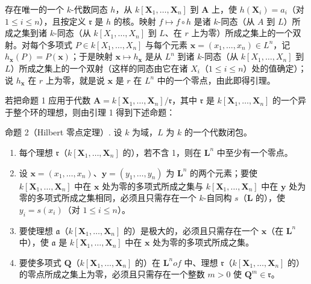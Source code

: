 存在唯一的一个 \(k\)-代数同态 \(h\)，从 \(k[\mathbf{X}_1, \ldots, \mathbf{X}_n]\) 到 \(\mathbf{A}\) 上，使 \(h(\mathbf{X}_i) = a_i\)（对 \(1 \leqslant i \leqslant n\)），且按定义 \(\mathfrak{r}\) 是 \(h\) 的核。映射 \(f \mapsto f \circ h\) 是诸 \(k\)-同态（从 \(A\) 到 \(L\)）所成之集到诸 \(k\)-同态（从 \(k[X_1, \ldots, X_n]\) 到 \(L\)、在 \(r\) 上为零）所成之集上的一个双射。对每个多项式 \(P \in k[X_1, \ldots, X_n]\) 与每个元素 \(\mathbf{x} = (x_1, \ldots, x_n) \in L^n\)，记 \(h_{\mathbf{x}}(P) = P(\mathbf{x})\)；于是映射 \(\mathbf{x} \mapsto h_{\mathbf{x}}\) 是从 \(L^n\) 到诸 \(k\)-同态（从 \(k[X_1, \ldots, X_n]\) 到 \(L\)）所成之集上的一个双射（这样的同态由它在诸 \(X_i\)（\(1 \leqslant i \leqslant n\)）处的值确定）；说 \(h_{\mathbf{x}}\) 在 \(r\) 上为零，就是说 \(\mathbf{x}\) 是 \(r\) 在 \(L^n\) 中的一个零点，由此即得引理。

若把命题 1 应用于代数 \(\mathbf{A} = k[\mathbf{X}_1, \ldots, \mathbf{X}_n] / \mathfrak{r}\)，其中 \(\mathfrak{r}\) 是 \(k[\mathbf{X}_1, \ldots, \mathbf{X}_n]\) 的一个异于整个环的理想，则由引理 1 得到下述命题：

命题 2（Hilbert 零点定理）. 设 \(k\) 为域，\(L\) 为 \(k\) 的一个代数闭包。

\begin{enumerate}
\def\labelenumi{(\roman{enumi})}
\item
  每个理想 \(\mathfrak{r}\)（\(k[\mathbf{X}_1, \ldots, \mathbf{X}_n]\) 的），若不含 1，则在 \(\mathbf{L}^n\) 中至少有一个零点。
\item
  设 \(\mathbf{x} = (x_1, \ldots, x_n)\)、\(\mathbf{y} = (y_1, \ldots, y_n)\) 为 \(\mathbf{L}^n\) 的两个元素；要使 \(k[\mathbf{X}_1, \ldots, \mathbf{X}_n]\) 中在 \(\mathbf{x}\) 处为零的多项式所成之集与 \(k[\mathbf{X}_1, \ldots, \mathbf{X}_n]\) 中在 \(\mathbf{y}\) 处为零的多项式所成之集相同，必须且只需存在一个 \(k\)-自同构 \(s\)（\(\mathbf{L}\) 的），使 \(y_i = s(x_i)\)（对 \(1 \leqslant i \leqslant n\)）。
\item
  要使理想 \(\mathfrak{a}\)（\(k[\mathbf{X}_1, \ldots, \mathbf{X}_n]\) 的）是极大的，必须且只需存在一个 \(\mathbf{x}\)（在 \(\mathbf{L}^n\) 中），使 \(\mathfrak{a}\) 是 \(k[\mathbf{X}_1, \ldots, \mathbf{X}_n]\) 中在 \(\mathbf{x}\) 处为零的多项式所成之集。
\item
  要使多项式 \(\mathbf{Q}\)（\(k[\mathbf{X}_1, \ldots, \mathbf{X}_n]\) 的）在 \(\mathbf{L}^n of\) 中、理想 \(\mathfrak{r}\)（\(k[\mathbf{X}_1, \ldots, \mathbf{X}_n]\) 的）的零点所成之集上为零，必须且只需存在一个整数 \(m > 0\) 使 \(\mathbf{Q}^m \in \mathfrak{r}\)。
\end{enumerate}


